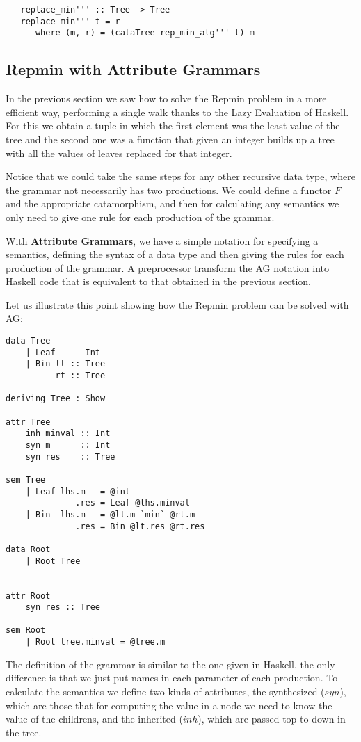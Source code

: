 \documentclass[a4paper,10pt]{article}
\begin{document}
  \begin{lstlisting}
   replace_min''' :: Tree -> Tree
   replace_min''' t = r
      where (m, r) = (cataTree rep_min_alg''' t) m
  \end{lstlisting}


\subsection{Repmin with Attribute Grammars}

In the previous section we saw how to solve the Repmin problem in a more efficient way, performing
a single walk thanks to the Lazy Evaluation of Haskell. For this we obtain a tuple in
which the first element was the least value of the tree and the second one was a function that
given an integer builds up a tree with all the values of leaves replaced for
that integer.

Notice that we could take the same steps for any other recursive data type, where the grammar
not necessarily has two productions. We could define a functor $F$ and the appropriate catamorphism,
and then for calculating any semantics we only need to give one rule for each production of the
grammar.

With \textbf{Attribute Grammars}, we have a simple notation for specifying a semantics, defining the
syntax of a data type and then giving the rules for each production of the grammar. A preprocessor
transform the AG notation into Haskell code that is equivalent to that obtained in the previous
section.

Let us illustrate this point showing how the Repmin problem can be solved with AG:

\begin{lstlisting}
data Tree
    | Leaf      Int
    | Bin lt :: Tree
	      rt :: Tree

deriving Tree : Show
	  
attr Tree
    inh minval :: Int
    syn m      :: Int
    syn res    :: Tree
      
sem Tree
    | Leaf lhs.m   = @int
              .res = Leaf @lhs.minval
	| Bin  lhs.m   = @lt.m `min` @rt.m
              .res = Bin @lt.res @rt.res

data Root
	| Root Tree
      
      
attr Root
	syn res :: Tree
      
sem Root
	| Root tree.minval = @tree.m
\end{lstlisting}

The definition of the grammar is similar to the one given in Haskell, the only difference is that we 
just put names in each parameter of each production. To calculate the semantics we define two kinds of 
attributes, the synthesized ($syn$), which are those that for computing the value in a node we need to 
know the value of the childrens, and the inherited ($inh$), which are passed top to down in the tree.
\end{document}
